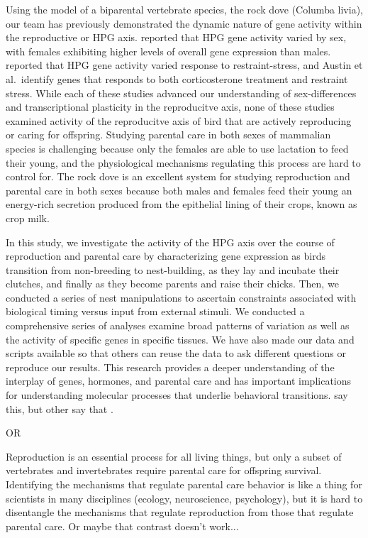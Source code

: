 Using the model of a biparental vertebrate species, the rock dove
(Columba livia), our team has previously demonstrated the dynamic nature
of gene activity within the reproductive or HPG axis.
\citet{MacManes2017} reported that HPG gene activity varied by sex, with
females exhibiting higher levels of overall gene expression than males.
\citet{Calisi2018} reported that HPG gene activity varied response to
restraint-stress, and Austin et al.~identify genes that responds to both
corticosterone treatment and restraint stress. While each of these
studies advanced our understanding of sex-differences and
transcriptional plasticity in the reproducitve axis, none of these
studies examined activity of the reproducitve axis of bird that are
actively reproducing or caring for offspring. Studying parental care in
both sexes of mammalian species is challenging because only the females
are able to use lactation to feed their young, and the physiological
mechanisms regulating this process are hard to control for. The rock
dove is an excellent system for studying reproduction and parental care
in both sexes because both males and females feed their young an
energy-rich secretion produced from the epithelial lining of their
crops, known as crop milk.

In this study, we investigate the activity of the HPG axis over the
course of reproduction and parental care by characterizing gene
expression as birds transition from non-breeding to nest-building, as
they lay and incubate their clutches, and finally as they become parents
and raise their chicks. Then, we conducted a series of nest
manipulations to ascertain constraints associated with biological timing
versus input from external stimuli. We conducted a comprehensive series
of analyses examine broad patterns of variation as well as the activity
of specific genes in specific tissues. We have also made our data and
scripts available so that others can reuse the data to ask different
questions or reproduce our results. This research provides a deeper
understanding of the interplay of genes, hormones, and parental care and
has important implications for understanding molecular processes that
underlie behavioral transitions. \citep[reviewed in][]{Lea1989} say
this, but other say that \citep[reviewed in][]{Dulac2014}. 


OR 

Reproduction is an essential process for all living things, but
only a subset of vertebrates and invertebrates require parental care for offspring survival. Identifying the mechanisms that regulate parental care behavior is like a thing for scientists in many disciplines (ecology, neuroscience, psychology), but it is hard to disentangle the mechanisms that regulate reproduction from those that regulate parental care. Or maybe that contrast doesn't work... 

